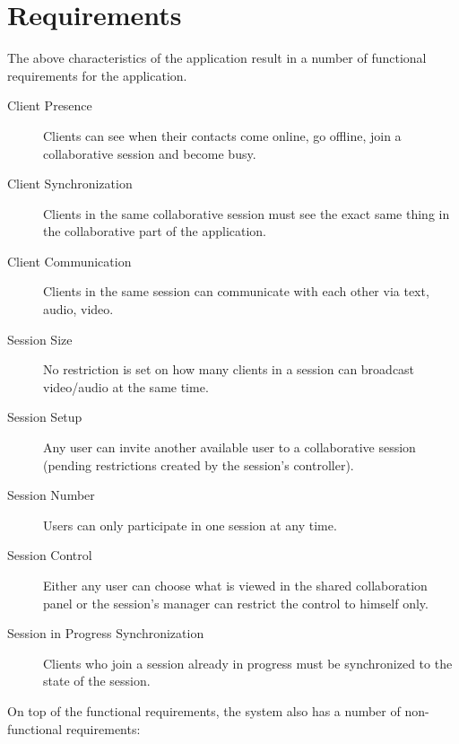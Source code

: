 \section{Requirements}

The above characteristics of the application result in a number of functional requirements for the application.

\begin{description}
	\item[Client Presence] Clients can see when their contacts come online, go offline, join a collaborative session and become busy.
	\item[Client Synchronization] Clients in the same collaborative session must see the exact same thing in the collaborative part of the application.
	\item[Client Communication] Clients in the same session can communicate with each other via text, audio, video. 
	\item[Session Size] No restriction is set on how many clients in a session can broadcast video/audio at the same time.
	\item[Session Setup] Any user can invite another available user to a collaborative session (pending restrictions created by the session's controller). 
	\item[Session Number] Users can only participate in one session at any time.
	\item[Session Control] Either any user can choose what is viewed in the shared collaboration panel or the session's manager can restrict the control to himself only.
	\item[Session in Progress Synchronization] Clients who join a session already in progress must be synchronized to the state of the session.
\end{description}

On top of the functional requirements, the system also has a number of non-functional requirements:

